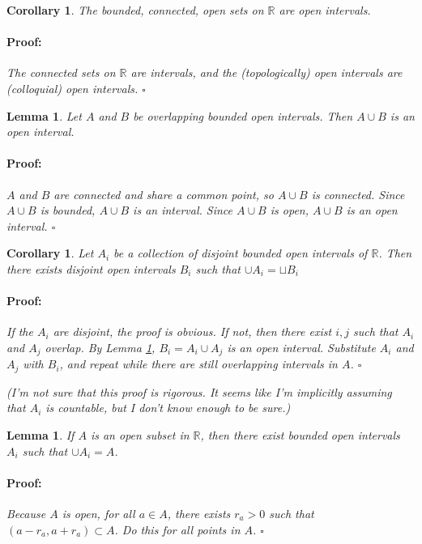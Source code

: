 \documentclass{article}
\newenvironment{proof}{\paragraph{Proof:}}{\hfill$\square$}
\newtheorem{lemma}[theorem]{Lemma}
\newtheorem{corollary}[theorem]{Corollary}
\begin{document}
\begin{corollary}
\label{OpenConnectedSetsAreOpenIntervals}
The bounded, connected, open sets on $\mathbb{R}$ are open intervals.
\begin{proof}
The connected sets on $\mathbb{R}$ are intervals, and the (topologically) open intervals are (colloquial) open intervals.
\end{proof}
\end{corollary}

\begin{lemma}
\label{OverlappingIntervalsAreIntervals}
Let $A$ and $B$ be overlapping bounded open intervals. Then $A \cup B$ is an open interval.
\begin{proof}
$A$ and $B$ are connected and share a common point, so $A \cup B$ is connected. Since $A \cup B$ is bounded, $A \cup B$ is an interval. Since $A \cup B$ is open, $A \cup B$ is an open interval.
\end{proof}
\end{lemma}

\begin{corollary}
\label{BoundedIntervalsBecomeDisjoint}
Let ${A_i}$ be a collection of disjoint bounded open intervals of $\mathbb{R}$. Then there exists disjoint open intervals ${B_i}$ such that $\cup A_i = \sqcup B_i$
\begin{proof}
If the $A_i$ are disjoint, the proof is obvious. If not, then there exist $i, j$ such that $A_i$ and $A_j$ overlap. By Lemma \ref{OverlappingIntervalsAreIntervals}, $B_i = A_i \cup A_j$ is an open interval. Substitute $A_i$ and $A_j$ with $B_i$, and repeat while there are still overlapping intervals in $A$.
\end{proof}

(I'm not sure that this proof is rigorous. It seems like I'm implicitly assuming that $A_i$ is countable, but I don't know enough to be sure.)
\end{corollary}

\begin{lemma}
\label{OpenSetsAreUnionsOfOpenIntervals}
If $A$ is an open subset in $\mathbb{R}$, then there exist bounded open intervals $A_i$ such that $\cup A_i = A$.
\begin{proof}
Because $A$ is open, for all $a \in A$, there exists $r_a > 0$ such that $(a-r_a, a+r_a) \subset A$. Do this for all points in $A$.
\end{proof}
\end{lemma}
\end{document}
